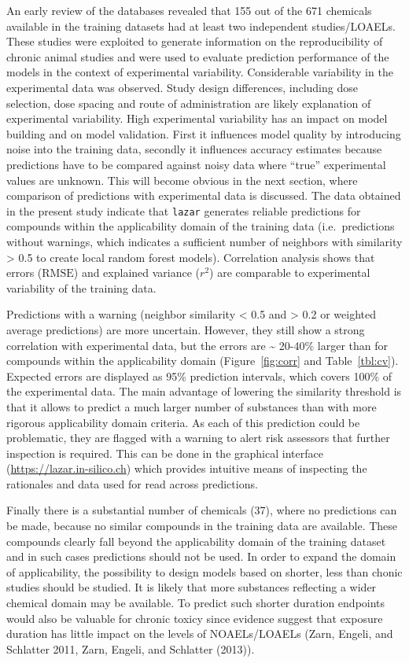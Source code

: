 \documentclass[]{achemso}
\begin{document}
An early review of the databases revealed that 155 out of the 671
chemicals available in the training datasets had at least two
independent studies/LOAELs. These studies were exploited to generate
information on the reproducibility of chronic animal studies and were
used to evaluate prediction performance of the models in the context of
experimental variability. Considerable variability in the experimental
data was observed. Study design differences, including dose selection,
dose spacing and route of administration are likely explanation of
experimental variability. High experimental variability has an impact on
model building and on model validation. First it influences model
quality by introducing noise into the training data, secondly it
influences accuracy estimates because predictions have to be compared
against noisy data where ``true'' experimental values are unknown. This
will become obvious in the next section, where comparison of predictions
with experimental data is discussed. The data obtained in the present
study indicate that \texttt{lazar} generates reliable predictions for
compounds within the applicability domain of the training data
(i.e.~predictions without warnings, which indicates a sufficient number
of neighbors with similarity \textgreater{} 0.5 to create local random
forest models). Correlation analysis shows that errors (\(\text{RMSE}\))
and explained variance (\(r^{2}\)) are comparable to experimental
variability of the training data.

Predictions with a warning (neighbor similarity \textless{} 0.5 and
\textgreater{} 0.2 or weighted average predictions) are more uncertain.
However, they still show a strong correlation with experimental data,
but the errors are \textasciitilde{} 20-40\% larger than for compounds
within the applicability domain (Figure~\ref{fig:corr} and
Table~\ref{tbl:cv}). Expected errors are displayed as 95\% prediction
intervals, which covers 100\% of the experimental data. The main
advantage of lowering the similarity threshold is that it allows to
predict a much larger number of substances than with more rigorous
applicability domain criteria. As each of this prediction could be
problematic, they are flagged with a warning to alert risk assessors
that further inspection is required. This can be done in the graphical
interface (\url{https://lazar.in-silico.ch}) which provides intuitive
means of inspecting the rationales and data used for read across
predictions.

Finally there is a substantial number of chemicals (37), where no
predictions can be made, because no similar compounds in the training
data are available. These compounds clearly fall beyond the
applicability domain of the training dataset and in such cases
predictions should not be used. In order to expand the domain of
applicability, the possibility to design models based on shorter, less
than chonic studies should be studied. It is likely that more substances
reflecting a wider chemical domain may be available. To predict such
shorter duration endpoints would also be valuable for chronic toxicy
since evidence suggest that exposure duration has little impact on the
levels of NOAELs/LOAELs (Zarn, Engeli, and Schlatter 2011, Zarn, Engeli,
and Schlatter (2013)).
\end{document}
